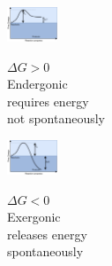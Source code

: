 \begin{minipage}{0.2\linewidth}
        \includegraphics[width=15mm]{src/images/Endergonic.png}\\ 
\end{minipage}
\begin{minipage}{0.28\linewidth}
    $\Delta G > 0$\\
    Endergonic\\
    requires energy\\
    not spontaneously\\
\end{minipage}
\begin{minipage}{0.2\linewidth}
        \includegraphics[width=15mm]{src/images/Exergonic.png}\\ 
\end{minipage}
\begin{minipage}{0.28\linewidth}
    $\Delta G < 0$\\
    Exergonic\\
    releases energy\\
    spontaneously\\
\end{minipage}


